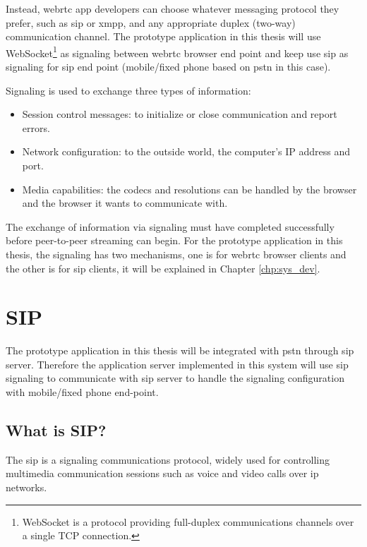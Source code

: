\par Instead, \gls{webrtc} app developers can choose whatever messaging protocol they prefer, such as \gls{sip} or \gls{xmpp}, and any appropriate duplex (two-way) communication channel. The prototype application in this thesis will use WebSocket\footnote{WebSocket is a protocol providing full-duplex communications channels over a single TCP connection.\cite{wiki:websocket}} as signaling between \gls{webrtc} browser end point and keep use \gls{sip} as signaling for \gls{sip} end point (mobile/fixed phone based on \gls{pstn} in this case).

\noindent Signaling is used to exchange three types of information\cite{html5rock:webrtc}:

\begin{itemize}[topsep=-1em,parsep=0em,itemsep=0em]
 \item Session control messages: to initialize or close communication and report errors.
 \item Network configuration: to the outside world, the computer's IP address and port.
 \item Media capabilities: the codecs and resolutions can be handled by the browser and the browser it wants to communicate with.
\end{itemize}

\par The exchange of information via signaling must have completed successfully before peer-to-peer streaming can begin. For the prototype application in this thesis, the signaling has two mechanisms, one is for \gls{webrtc} browser clients and the other is for \gls{sip} clients, it will be explained in Chapter \ref{chp:sys_dev}.

\section{SIP}
\noindent The prototype application in this thesis will be integrated with \gls{pstn} through \gls{sip} server. Therefore the application server implemented in this system will use \gls{sip} signaling to communicate with \gls{sip} server to handle the signaling configuration with mobile/fixed phone end-point.

\subsection{What is SIP?}
\noindent The \gls{sip} is a signaling communications protocol, widely used for controlling multimedia communication sessions such as voice and video calls over \gls{ip} networks.


